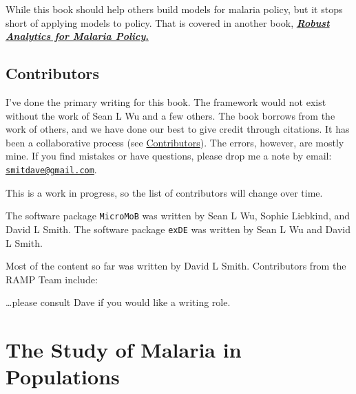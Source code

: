 \documentclass[
]{book}
\begin{document}
While this book should help others build models for malaria policy, but it stops short of applying models to policy. That is covered in another book, \href{../../RAMP-Book/_book/index.html}{\textbf{\emph{Robust Analytics for Malaria Policy}.}}

\hypertarget{contributors}{%
\section*{Contributors}\label{contributors}}

I've done the primary writing for this book. The framework would not exist without the work of Sean L Wu and a few others. The book borrows from the work of others, and we have done our best to give credit through citations. It has been a collaborative process (see \protect\hyperlink{contributors}{Contributors}). The errors, however, are mostly mine. If you find mistakes or have questions, please drop me a note by email: \href{mailto:smitdave@gmail.com}{\nolinkurl{smitdave@gmail.com}}.

This is a work in progress, so the list of contributors will change over time.

The software package \texttt{MicroMoB} was written by Sean L Wu, Sophie Liebkind, and David L Smith. The software package \texttt{exDE} was written by Sean L Wu and David L Smith.

Most of the content so far was written by David L Smith. Contributors from the RAMP Team include:

\ldots please consult Dave if you would like a writing role.

\hypertarget{the-study-of-malaria-in-populations}{%
\chapter{The Study of Malaria in Populations}\label{the-study-of-malaria-in-populations}}
\end{document}
